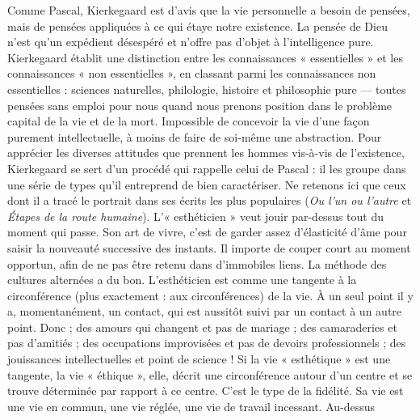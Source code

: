 \documentclass[12pt,a4paper]{article}
\newcommand{\opage}[1]{\marginnote{\footnotesize\textit{[#1]}}}
\begin{document}
Comme Pascal, Kierkegaard est d'avis que la vie personnelle a
besoin de pensées, mais de pensées appliquées à ce qui étaye notre
existence. La pensée de Dieu n'est qu'un expédient désespéré
et n'offre pas d'objet à l'intelligence pure. Kierkegaard établit une
distinction entre les connaissances « essentielles » et les connaissances
« non essentielles », en classant parmi les connaissances non
essentielles : sciences naturelles, philologie, histoire et philosophie
pure --- toutes pensées sans emploi pour nous quand nous prenons
position dans le problème capital de la vie et de la mort. Impossible
de concevoir la vie d'une façon purement intellectuelle, à moins de
faire de soi-même une abstraction. Pour apprécier les diverses attitudes
que prennent les hommes vis-à-vis de l'existence, Kierkegaard
se sert d'un procédé qui rappelle celui de Pascal : il les groupe
dans une série de types qu'il entreprend de bien caractériser. Ne
retenons ici que ceux dont il a tracé le portrait dans ses écrits les
plus populaires (\emph{Ou l'un ou l'autre} et \emph{Étapes de la route humaine}).
L'« esthéticien » veut jouir par-dessus tout du moment qui passe.
Son art de vivre, c'est de garder assez d'élasticité d'âme pour saisir
la nouveauté successive des instants. Il importe de couper court au
moment opportun, afin de ne pas être retenu dans d'immobiles
liens. La méthode des cultures alternées a du bon. L'esthéticien est
comme une tangente à la circonférence (plus exactement : aux circonférences)
de la vie. À un seul point il y a, momentanément, un
contact, qui est aussitôt suivi par un contact à un autre point. Donc ;
des amours qui changent et pas de mariage ; des camaraderies et
\opage{234} pas d'amitiés ; des occupations improvisées et pas de devoirs professionnels ;
des jouissances intellectuelles et point de science ! Si
la vie « esthétique » est une tangente, la vie « éthique », elle, décrit
une circonférence autour d'un centre et se trouve déterminée
par rapport à ce centre. C'est le type de la fidélité. Sa vie est une
vie en commun, une vie réglée, une vie de travail incessant. Au-dessus
\end{document}
